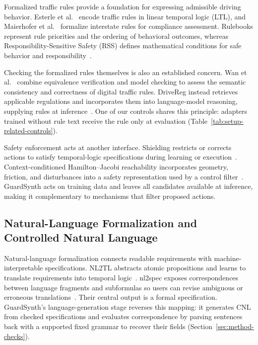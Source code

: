 Formalized traffic rules provide a foundation for expressing
admissible driving behavior. Esterle et al.~\cite{r6} encode traffic rules in
linear temporal logic (LTL), and Maierhofer et al.~\cite{Maierhofer2020} formalize interstate
rules for compliance assessment. Rulebooks
represent rule priorities and the ordering of behavioral outcomes,
whereas Responsibility-Sensitive Safety (RSS) defines mathematical
conditions for safe behavior and responsibility~\cite{Censi2019,ShalevShwartz2017}.
\par

Checking the formalized rules themselves is also an established
concern. Wan et al.~\cite{Wan2024} combine equivalence verification and model
checking to assess the semantic consistency and correctness of digital
traffic rules. DriveReg instead retrieves applicable
regulations and incorporates them into language-model
reasoning, supplying rules at inference~\cite{r7}. One of our controls shares
this principle: adapters trained without rule
text receive the rule only at evaluation
(Table~\ref{tab:setup-related-controls}).\par

Safety enforcement acts at another interface. Shielding restricts or
corrects actions to satisfy temporal-logic specifications during
learning or execution~\cite{Alshiekh2018}. Context-conditioned
Hamilton--Jacobi reachability incorporates geometry, friction, and
disturbances into a safety representation used by a control
filter~\cite{r19}. GuardSynth acts on training data and leaves all candidates
available at inference, making it complementary to mechanisms that filter
proposed actions.\par

\subsection{Natural-Language Formalization and Controlled Natural Language}

Natural-language formalization connects readable requirements with
machine-interpretable specifications. NL2TL abstracts atomic
propositions and learns to translate requirements into temporal logic~\cite{r8}.
nl2spec exposes correspondences between language fragments and
subformulas so users can revise ambiguous or erroneous
translations~\cite{r9}. Their central output is a formal
specification. GuardSynth's language-generation stage reverses this mapping:
it generates CNL from checked specifications and evaluates correspondence by
parsing sentences back with a supported fixed grammar to recover their fields
(Section~\ref{sec:method-checks}).\par

